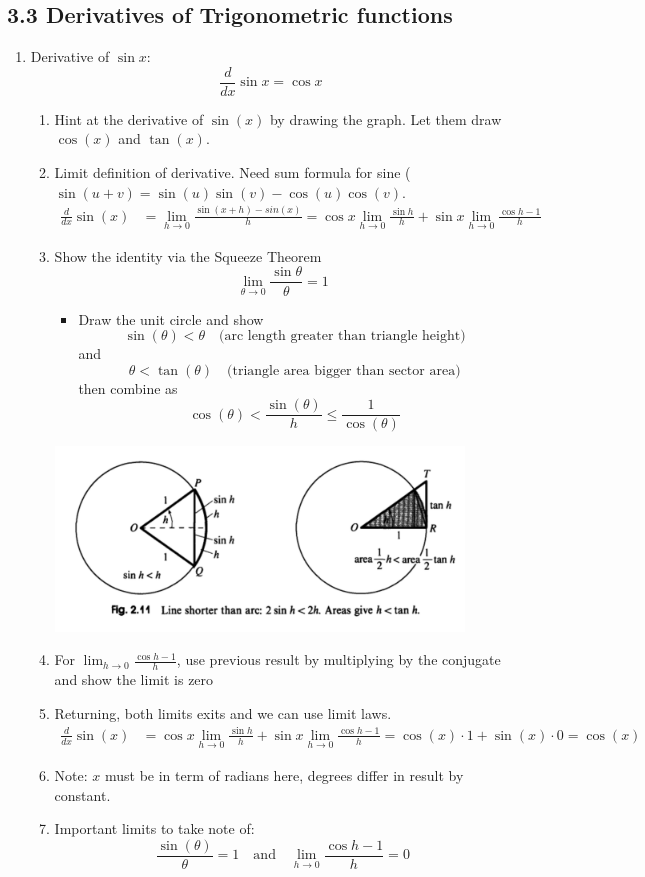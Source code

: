 \documentclass{article}
\begin{document}
\subsection{3.3 Derivatives of Trigonometric functions}
\begin{enumerate}

\item Derivative of $\sin x$:
$$
\frac{d}{dx} \sin x = \cos x
$$
\begin{enumerate}
\item Hint at the derivative of $\sin(x)$ by drawing the graph. Let them draw $\cos(x)$ and $\tan(x)$.
\item Limit definition of derivative. Need sum formula for sine ($\sin(u+v) = \sin(u)\sin(v) - \cos(u)\cos(v)$.
\begin{align*}
\frac{d}{dx}\sin(x) &= \lim_{h\rightarrow 0} \frac{\sin(x+h)-sin(x)}{h}
= \cos x\lim_{h\rightarrow 0}\frac{\sin h}{h}+\sin x\lim_{h\rightarrow 0}\frac{\cos h-1}{h}
\end{align*}
\item Show the identity via the Squeeze Theorem
$$
\lim_{\theta\rightarrow 0} \frac{\sin \theta}{\theta} = 1
$$
\begin{itemize}
\item Draw the unit circle and show
$$
\sin(\theta)<\theta \quad \text{(arc length greater than triangle height)}
$$
and
$$
\theta <\tan(\theta) \quad \text{(triangle area bigger than sector area)}
$$
then combine as
$$
\cos(\theta) < \frac{\sin(\theta)}{h} \leq \frac{1}{\cos(\theta)}
$$
\end{itemize}
\begin{center}
\includegraphics[width=0.9\textwidth]{33pic.png}
\end{center}
\item For $\lim_{h\rightarrow 0}\frac{\cos h-1}{h}$, use previous result by multiplying by the conjugate and show the limit is zero
\item Returning, both limits exits and we can use limit laws.
\begin{align*}
\frac{d}{dx}\sin(x) &= \cos x\lim_{h\rightarrow 0}\frac{\sin h}{h}+\sin x\lim_{h\rightarrow 0}\frac{\cos h-1}{h} 
= \cos(x) \cdot 1 + \sin(x) \cdot 0 = \cos(x)
\end{align*}
\item Note: $x$ must be in term of radians here, degrees differ in result by constant.
\item Important limits to take note of:
$$
\frac{\sin(\theta)}{\theta} = 1 \quad \text{and} \quad \lim_{h\rightarrow 0}\frac{\cos h-1}{h} = 0
$$
\end{enumerate}



\end{enumerate}
\end{document}
